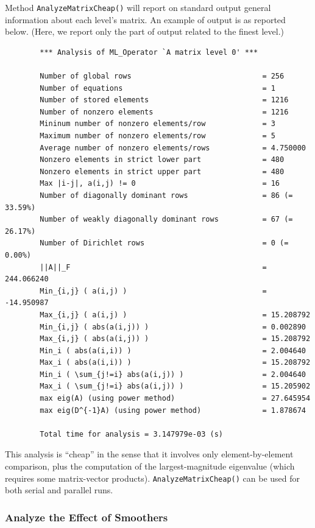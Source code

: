 \documentclass{article}[11pt]
\begin{document}
Method \verb!AnalyzeMatrixCheap()! will
report on standard output general information about each level's matrix. An
example of output is as reported below. (Here, we report only the part of output
related to the finest level.)
\begin{verbatim}
        *** Analysis of ML_Operator `A matrix level 0' ***

        Number of global rows                              = 256
        Number of equations                                = 1
        Number of stored elements                          = 1216
        Number of nonzero elements                         = 1216
        Mininum number of nonzero elements/row             = 3
        Maximum number of nonzero elements/row             = 5
        Average number of nonzero elements/rows            = 4.750000
        Nonzero elements in strict lower part              = 480
        Nonzero elements in strict upper part              = 480
        Max |i-j|, a(i,j) != 0                             = 16
        Number of diagonally dominant rows                 = 86 (= 33.59%)
        Number of weakly diagonally dominant rows          = 67 (= 26.17%)
        Number of Dirichlet rows                           = 0 (=  0.00%)
        ||A||_F                                            = 244.066240
        Min_{i,j} ( a(i,j) )                               = -14.950987
        Max_{i,j} ( a(i,j) )                               = 15.208792
        Min_{i,j} ( abs(a(i,j)) )                          = 0.002890
        Max_{i,j} ( abs(a(i,j)) )                          = 15.208792
        Min_i ( abs(a(i,i)) )                              = 2.004640
        Max_i ( abs(a(i,i)) )                              = 15.208792
        Min_i ( \sum_{j!=i} abs(a(i,j)) )                  = 2.004640
        Max_i ( \sum_{j!=i} abs(a(i,j)) )                  = 15.205902
        max eig(A) (using power method)                    = 27.645954
        max eig(D^{-1}A) (using power method)              = 1.878674

        Total time for analysis = 3.147979e-03 (s)
\end{verbatim}
This analysis is ``cheap'' in the sense that it involves only element-by-element
comparison, plus the computation of the largest-magnitude eigenvalue (which
requires some matrix-vector products). \verb!AnalyzeMatrixCheap()! can be used
for both serial and parallel runs.


\subsubsection{Analyze the Effect of Smoothers}
\end{document}
